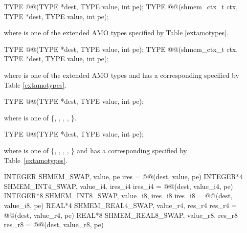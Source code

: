 
\begin{apidefinition}

\begin{C11synopsis}
TYPE @@(TYPE *dest, TYPE value, int pe);
TYPE @@(shmem_ctx_t ctx, TYPE *dest, TYPE value, int pe);
\end{C11synopsis}
where \TYPE{} is one of the extended \ac{AMO} types specified by Table \ref{extamotypes}.

\begin{Csynopsis}
TYPE @@(TYPE *dest, TYPE value, int pe);
TYPE @@(shmem_ctx_t ctx, TYPE *dest, TYPE value, int pe);
\end{Csynopsis}
where \TYPE{} is one of the extended \ac{AMO} types and has a corresponding \TYPENAME{} specified by Table \ref{extamotypes}.

\begin{DeprecateBlock}
\begin{C11synopsis}
TYPE @@(TYPE *dest, TYPE value, int pe);
\end{C11synopsis}
where \TYPE{} is one of \{, , ,
, \}.

\begin{Csynopsis}
TYPE @@(TYPE *dest, TYPE value, int pe);
\end{Csynopsis}
where \TYPE{} is one of \{, , ,
, \} and has a corresponding
\TYPENAME{} specified by Table~\ref{extamotypes}.
\end{DeprecateBlock}

\begin{Fsynopsis}
INTEGER SHMEM_SWAP, value, pe
ires = @@(dest, value, pe)
INTEGER*4 SHMEM_INT4_SWAP, value_i4, ires_i4
ires\_i4 = @@(dest, value_i4, pe)
INTEGER*8 SHMEM_INT8_SWAP, value_i8, ires_i8
ires\_i8 = @@(dest, value_i8, pe)
REAL*4 SHMEM_REAL4_SWAP, value_r4, res_r4
res\_r4 = @@(dest, value_r4, pe)
REAL*8 SHMEM_REAL8_SWAP, value_r8, res_r8
res\_r8 = @@(dest, value_r8, pe)
\end{Fsynopsis}


\end{apidefinition}
